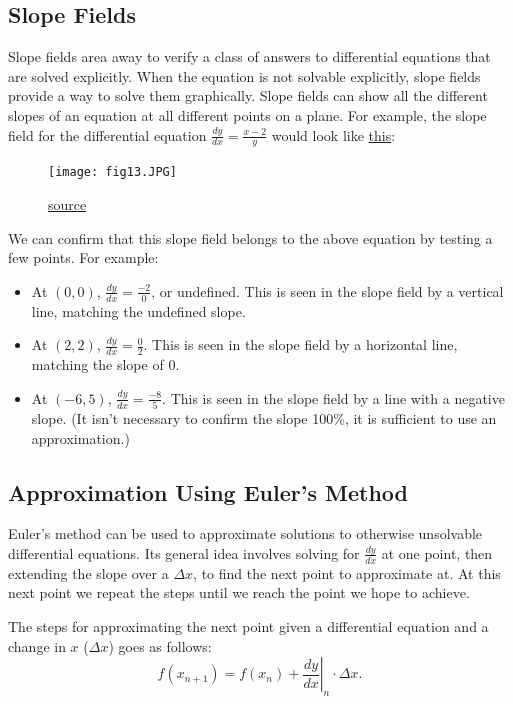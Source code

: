 \documentclass[12pt]{article}
\begin{document}
\subsection{Slope Fields}
Slope fields area away to verify a class of answers to differential equations that are solved explicitly. When the equation is not solvable explicitly, slope fields provide a way to solve them graphically. Slope fields can show all the different slopes of an equation at all different points on a plane. For example, the slope field for the differential equation $\frac{dy}{dx} = \frac{x-2}{y}$ would look like \hyperref[fig:slopefield1]{this}:

\begin{figure}[H]
    \begin{center}
        \texttt{[image: fig13.JPG]}
        \caption{\href{https://www.khanacademy.org/math/ap-calculus-bc/bc-differential-equations-new}{source}}
        \label{fig:slopefield1}
    \end{center}
\end{figure}

We can confirm that this slope field belongs to the above equation by testing a few points. For example:
\begin{itemize}
    \item At $(0, 0)$, $\frac{dy}{dx} = \frac{-2}{0}$, or undefined. This is seen in the slope field by a vertical line, matching the undefined slope.
    \item At $(2, 2)$, $\frac{dy}{dx} = \frac{0}{2}$. This is seen in the slope field by a horizontal line, matching the slope of $0$.
    \item At $(-6, 5)$, $\frac{dy}{dx} = \frac{-8}{5}$. This is seen in the slope field by a line with a negative slope. (It isn't necessary to confirm the slope 100\%, it is sufficient to use an approximation.)
\end{itemize}

\subsection{Approximation Using Euler's Method}
Euler's method can be used to approximate solutions to otherwise unsolvable differential equations. Its general idea involves solving for $\frac{dy}{dx}$ at one point, then extending the slope over a $\Delta x$, to find the next point to approximate at. At this next point we repeat the steps until we reach the point we hope to achieve.

The steps for approximating the next point given a differential equation and a change in $x$ ($\Delta x$) goes as follows:
\[ f(x_{n+1}) = f(x_n) + \left. \frac{dy}{dx} \right \vert_n \cdot \Delta x. \]
\end{document}
